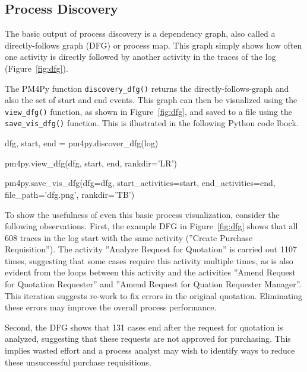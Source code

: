 \subsection*{Process Discovery}

The basic output of process discovery is a dependency graph, also called a directly-follows graph (DFG) or process map. This graph simply shows how often one activity is directly followed by another activity in the traces of the log (Figure~\ref{fig:dfg}). 
\begin{withcode}
The PM4Py function \texttt{discovery\_dfg()} returns the directly-follows-graph and also the set of start and end events. This graph can then be visualized using the \texttt{view\_dfg()} function, as shown in Figure~\ref{fig:dfg}, and saved to a file using the \texttt{save\_vis\_dfg()} function. This is illustrated in the following Python code lbock.

\begin{pythoncode}
dfg, start, end = pm4py.discover_dfg(log)

pm4py.view_dfg(dfg, start, end, rankdir='LR')

pm4py.save_vis_dfg(dfg=dfg,
    start_activities=start, end_activities=end, 
    file_path='dfg.png', rankdir='TB')
\end{pythoncode}
\end{withcode}

To show the usefulness of even this basic process visualization, consider the following observations. First, the example DFG in Figure~\ref{fig:dfg} shows that all 608 traces in the log start with the same activity (''Create Purchase Requisition''). The activity ''Analyze Request for Quotation'' is carried out 1107 times, suggesting that some cases require this activity multiple times, as is also evident from the loops between this activity and the activities ''Amend Request for Quotation Requester'' and ''Amend Request for Quation Requester Manager''. This iteration suggests re-work to fix errors in the original quotation. Eliminating these errors may improve the overall process performance. 

Second, the DFG shows that 131 cases end after the request for quotation is analyzed, suggesting that these requests are not approved for purchasing. This implies wasted effort and a process analyst may wish to identify ways to reduce these unsuccessful purchase requisitions. 

